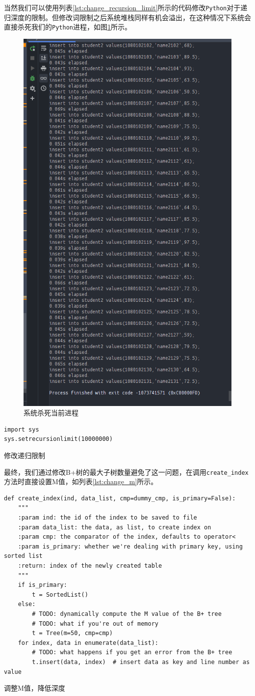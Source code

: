 \documentclass[UTF8]{ctexrep} %
\newenvironment{longlisting}{\captionsetup{type=listing}}{}
\begin{document}
当然我们可以使用列表\ref{lst:change_recursion_limit}所示的代码修改\texttt{Python}对于递归深度的限制。但修改词限制之后系统堆栈同样有机会溢出，在这种情况下系统会直接杀死我们的\texttt{Python}进程，如图\ref{fig:kill_process}所示。

\begin{figure}[H]
    \centering
    \includegraphics[width=0.4\linewidth]{figure/system_termination.png}
    \caption{系统杀死当前进程}
    \label{fig:kill_process}
\end{figure}

\begin{longlisting}
    \begin{verbatim}
import sys
sys.setrecursionlimit(10000000)
    \end{verbatim}
    \caption{修改递归限制}
    \label{lst:change_recursion_limit}
\end{longlisting}
最终，我们通过修改B+树的最大子树数量避免了这一问题，在调用\texttt{create\_index}方法时直接设置M值，如列表\ref{lst:change_m}所示。

\begin{longlisting}
    \begin{verbatim}
def create_index(ind, data_list, cmp=dummy_cmp, is_primary=False):
    """
    :param ind: the id of the index to be saved to file
    :param data_list: the data, as list, to create index on
    :param cmp: the comparator of the index, defaults to operator<
    :param is_primary: whether we're dealing with primary key, using sorted list
    :return: index of the newly created table
    """
    if is_primary:
        t = SortedList()
    else:
        # TODO: dynamically compute the M value of the B+ tree
        # TODO: what if you're out of memory
        t = Tree(m=50, cmp=cmp)
    for index, data in enumerate(data_list):
        # TODO: what happens if you get an error from the B+ tree
        t.insert(data, index)  # insert data as key and line number as value
    \end{verbatim}
    \caption{调整M值，降低深度}
    \label{lst:change_m}
\end{longlisting}
\end{document}
